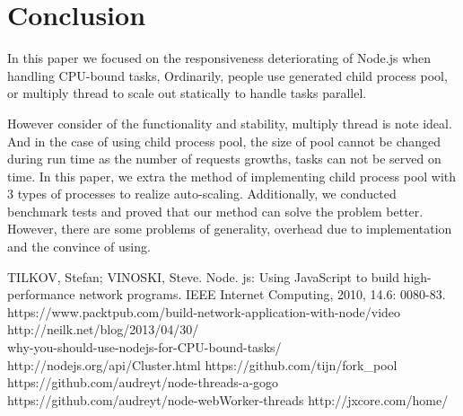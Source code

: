 \documentclass[JIP]{ipsj}
\begin{document}
\section{Conclusion}
In this paper we focused on the responsiveness deteriorating of Node.js when handling CPU-bound tasks,
Ordinarily, people use generated child process pool, or multiply thread to scale out statically to handle tasks parallel.

However consider of the functionality and stability, multiply thread is note ideal.
And in the case of using child process pool, the size of pool cannot be changed during run time as the number of requests growths, tasks can not be served on time. 
In this paper, we extra the method of implementing child process pool with 3 types of processes to realize auto-scaling. Additionally, we conducted benchmark tests and proved that our method can solve the problem better. However, there are some problems of generality, overhead due to implementation and the convince of using.

\begin{thebibliography}{9}%
TILKOV, Stefan; VINOSKI, Steve. Node. js: Using JavaScript to build high-performance network programs. IEEE Internet Computing, 2010, 14.6: 0080-83.
https://www.packtpub.com/build-network-application-with-node/video
http://neilk.net/blog/2013/04/30/\\why-you-should-use-nodejs-for-CPU-bound-tasks/
http://nodejs.org/api/Cluster.html
https://github.com/tijn/fork\_pool
https://github.com/audreyt/node-threads-a-gogo
https://github.com/audreyt/node-webWorker-threads
http://jxcore.com/home/

\end{thebibliography}
\end{document}
